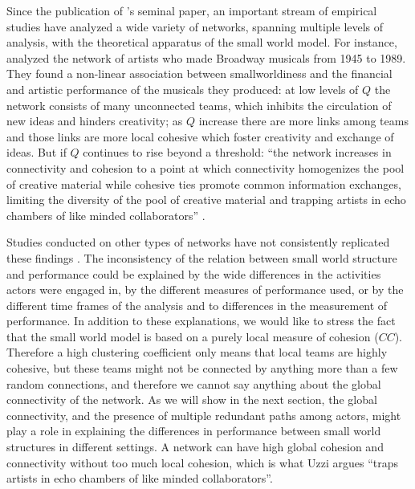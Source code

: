 Since the publication of \citeauthor{watts:1998}'s seminal paper, an important stream of empirical studies have analyzed a wide variety of networks, spanning multiple levels of analysis, with the theoretical apparatus of the small world model. For instance, \citet{uzzi:2005} analyzed the network of artists who made Broadway musicals from 1945 to 1989. They found a non-linear association between smallworldiness and the financial and artistic performance of the musicals they produced: at low levels of $Q$ the network consists of many unconnected teams, which inhibits the circulation of new ideas and hinders creativity; as $Q$ increase there are more links among teams and those links are more local cohesive which foster creativity and exchange of ideas. But if $Q$ continues to rise beyond a threshold: ``the network increases in connectivity and cohesion to a point at which connectivity homogenizes the pool of creative material while cohesive ties promote common information exchanges, limiting the diversity of the pool of creative material and trapping artists in echo chambers of like minded collaborators'' \citep[87]{uzzi:2007}.

Studies conducted on other types of networks have not consistently replicated these findings \citep*[for a recent review see][]{uzzi:2007}. The inconsistency of the relation between small world structure and performance could be explained by the wide differences in the activities actors were engaged in, by the different measures of performance used, or by the different time frames of the analysis and to differences in the measurement of performance. In addition to these explanations, we would like to stress the fact that the small world model is based on a purely local measure of cohesion ($CC$). Therefore a high clustering coefficient only means that local teams are highly cohesive, but these teams might not be connected by anything more than a few random connections, and therefore we cannot say anything about the global connectivity of the network. As we will show in the next section, the global connectivity, and the presence of multiple redundant paths among actors, might play a role in explaining the differences in performance between small world structures in different settings. A network can have high global cohesion and connectivity without too much local cohesion, which is what Uzzi argues ``traps artists in echo chambers of like minded collaborators''.

